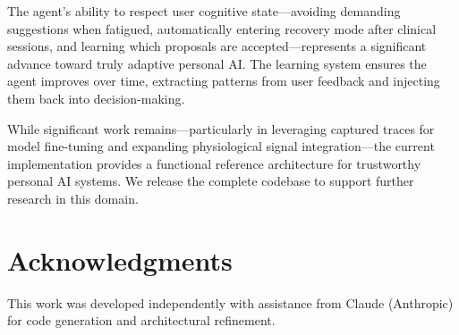 \documentclass[11pt,a4paper]{article}
\begin{document}
The agent's ability to respect user cognitive state---avoiding demanding suggestions when fatigued, automatically entering recovery mode after clinical sessions, and learning which proposals are accepted---represents a significant advance toward truly adaptive personal AI. The learning system ensures the agent improves over time, extracting patterns from user feedback and injecting them back into decision-making.

While significant work remains---particularly in leveraging captured traces for model fine-tuning and expanding physiological signal integration---the current implementation provides a functional reference architecture for trustworthy personal AI systems. We release the complete codebase to support further research in this domain.

\section*{Acknowledgments}

This work was developed independently with assistance from Claude (Anthropic) for code generation and architectural refinement.
\end{document}
